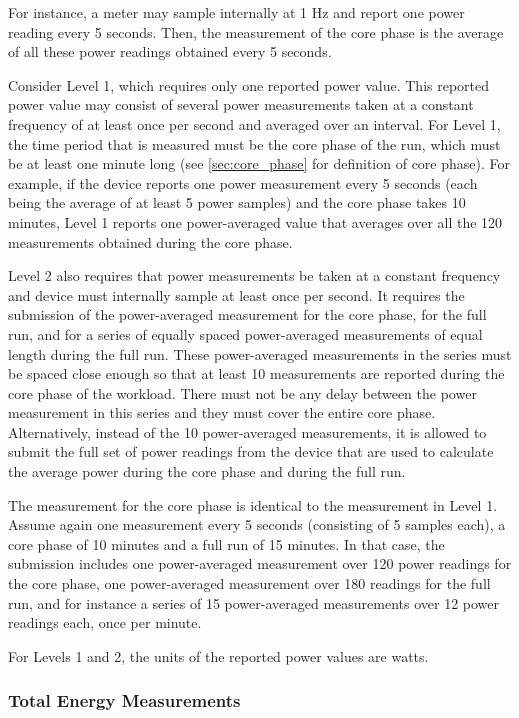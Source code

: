 \noindent
For instance, a meter may sample internally at 1 Hz and report one power reading every 5 seconds.
Then, the measurement of the core phase is the average of all these power readings obtained every 5 seconds.
\wl

\noindent
Consider Level 1, which requires only one reported power value. 
This reported power value may consist of several power measurements taken at a constant frequency of at least once per second and averaged over an interval.
For Level 1, the time period that is measured must be the core phase of the run, which must be at least one minute long (see \ref{sec:core_phase} for definition of core phase).
For example, if the device reports one power measurement every 5 seconds (each being the average of at least 5 power samples) and the core phase takes 10 minutes, Level 1 reports one power-averaged value that averages over all the 120 measurements obtained during the core phase.
\wl

\noindent
Level 2 also requires that power measurements be taken at a constant frequency and device must internally sample at least once per second.
It requires the submission of the power-averaged measurement for the core phase, for the full run, and for a series of equally spaced power-averaged measurements of equal length during the full run.
These power-averaged measurements in the series must be spaced close enough so that at least 10 measurements are reported during the core phase of the workload.
There must not be any delay between the power measurement in this series and they must cover the entire core phase.
Alternatively, instead of the 10 power-averaged measurements, it is allowed to submit the full set of power readings from the device that are used to calculate the average power during the core phase and during the full run.
\wl

\noindent
The measurement for the core phase is identical to the measurement in Level 1.
Assume again one measurement every 5 seconds (consisting of 5 samples each), a core phase of 10 minutes and a full run of 15 minutes.
In that case, the submission includes one power-averaged measurement over 120 power readings for the core phase, one power-averaged measurement over 180 readings for the full run, and for instance a series of 15 power-averaged measurements over 12 power readings each, once per minute.
\wl

\noindent
For Levels 1 and 2, the units of the reported power values are watts.
\wl

\subsubsection{Total Energy Measurements}

